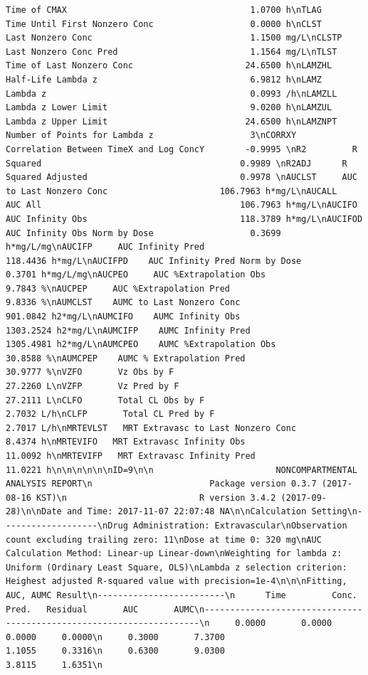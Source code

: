 \documentclass[12pt,]{krantz}
\theoremstyle{definition}
\theoremstyle{definition}
\theoremstyle{definition}
\theoremstyle{remark}
\begin{document}
\begin{verbatim}
Time of CMAX                                    1.0700 h\nTLAG       Time Until First Nonzero Conc                   0.0000 h\nCLST       Last Nonzero Conc                               1.1500 mg/L\nCLSTP      Last Nonzero Conc Pred                          1.1564 mg/L\nTLST       Time of Last Nonzero Conc                      24.6500 h\nLAMZHL     Half-Life Lambda z                              6.9812 h\nLAMZ       Lambda z                                        0.0993 /h\nLAMZLL     Lambda z Lower Limit                            9.0200 h\nLAMZUL     Lambda z Upper Limit                           24.6500 h\nLAMZNPT    Number of Points for Lambda z                   3\nCORRXY     Correlation Between TimeX and Log ConcY        -0.9995 \nR2         R Squared                                       0.9989 \nR2ADJ      R Squared Adjusted                              0.9978 \nAUCLST     AUC to Last Nonzero Conc                      106.7963 h*mg/L\nAUCALL     AUC All                                       106.7963 h*mg/L\nAUCIFO     AUC Infinity Obs                              118.3789 h*mg/L\nAUCIFOD    AUC Infinity Obs Norm by Dose                   0.3699 h*mg/L/mg\nAUCIFP     AUC Infinity Pred                             118.4436 h*mg/L\nAUCIFPD    AUC Infinity Pred Norm by Dose                  0.3701 h*mg/L/mg\nAUCPEO     AUC %Extrapolation Obs                          9.7843 %\nAUCPEP     AUC %Extrapolation Pred                         9.8336 %\nAUMCLST    AUMC to Last Nonzero Conc                     901.0842 h2*mg/L\nAUMCIFO    AUMC Infinity Obs                            1303.2524 h2*mg/L\nAUMCIFP    AUMC Infinity Pred                           1305.4981 h2*mg/L\nAUMCPEO    AUMC %Extrapolation Obs                        30.8588 %\nAUMCPEP    AUMC % Extrapolation Pred                      30.9777 %\nVZFO       Vz Obs by F                                    27.2260 L\nVZFP       Vz Pred by F                                   27.2111 L\nCLFO       Total CL Obs by F                               2.7032 L/h\nCLFP       Total CL Pred by F                              2.7017 L/h\nMRTEVLST   MRT Extravasc to Last Nonzero Conc              8.4374 h\nMRTEVIFO   MRT Extravasc Infinity Obs                     11.0092 h\nMRTEVIFP   MRT Extravasc Infinity Pred                    11.0221 h\n\n\n\n\n\nID=9\n\n                        NONCOMPARTMENTAL ANALYSIS REPORT\n                       Package version 0.3.7 (2017-08-16 KST)\n                          R version 3.4.2 (2017-09-28)\n\nDate and Time: 2017-11-07 22:07:48 NA\n\nCalculation Setting\n-------------------\nDrug Administration: Extravascular\nObservation count excluding trailing zero: 11\nDose at time 0: 320 mg\nAUC Calculation Method: Linear-up Linear-down\nWeighting for lambda z: Uniform (Ordinary Least Square, OLS)\nLambda z selection criterion: Heighest adjusted R-squared value with precision=1e-4\n\n\nFitting, AUC, AUMC Result\n-------------------------\n      Time         Conc.      Pred.   Residual       AUC       AUMC\n---------------------------------------------------------------------\n     0.0000       0.0000                           0.0000     0.0000\n     0.3000       7.3700                           1.1055     0.3316\n     0.6300       9.0300                           3.8115     1.6351\n     
\end{verbatim}
\end{document}
